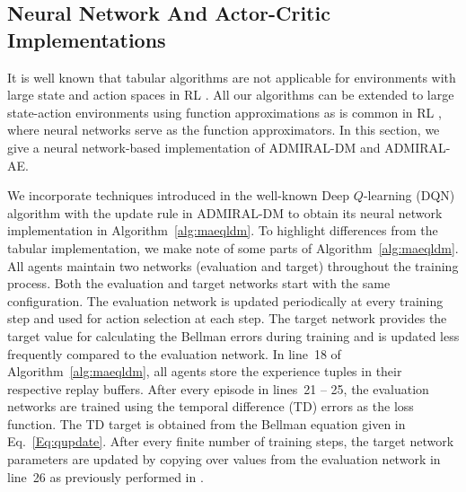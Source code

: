 \documentclass[jair, twoside,11pt,theapa]{article}
\begin{document}
\subsection{Neural Network And Actor-Critic Implementations}\label{sec:nnimplementation}
It is well known that tabular algorithms are not applicable for environments with large state and action spaces in RL \citep{mnih2016asynchronous}. All our algorithms can be extended to large state-action  environments using function approximations as is common in RL \citep{mnih2015human, mnih2016asynchronous}, where neural networks serve as the function approximators. In this section, we give a neural network-based implementation of ADMIRAL-DM and ADMIRAL-AE. 





We incorporate techniques introduced in the well-known Deep $Q$-learning (DQN) algorithm \citep{mnih2015human} with the update rule in ADMIRAL-DM to obtain its neural network implementation in Algorithm~\ref{alg:maeqldm}.  To highlight differences from the tabular implementation, we  make note of some parts of Algorithm~\ref{alg:maeqldm}. All agents maintain two networks (evaluation and target) throughout the training process. Both the evaluation and target networks start with the same configuration. The evaluation network is updated periodically at every training step and used for action selection at each step. The target network provides the target value for calculating the Bellman errors during training and is updated less frequently compared to the evaluation network. In line~18 of Algorithm~\ref{alg:maeqldm}, all agents store the experience tuples in their respective replay buffers. After every episode in lines~21 -- 25, the evaluation networks are trained using the temporal difference (TD) errors as the loss function. The TD target is obtained from the Bellman equation given in Eq.~\ref{Eq:qupdate}. After every finite number of training steps, the target network parameters are updated by copying over values from the evaluation network in line~26 as previously performed in \cite{mnih2015human}. 

\end{document}
